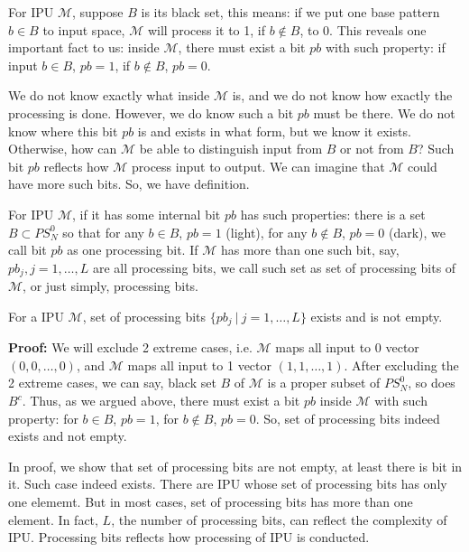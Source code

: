 For IPU $\mathcal{M}$, suppose $B$ is its black set, this means: if we put one base pattern $b \in B$ to input space, $\mathcal{M}$ will process it to 1, if $b \notin B$, to 0. This reveals one important fact to us: inside $\mathcal{M}$, there must exist a bit $pb$ with such property: if input $b \in B$, $pb = 1$, if $b \notin B$, $pb = 0$. 

We do not know exactly what inside $\mathcal{M}$ is, and we do not know how exactly the processing is done. However, we do know such a bit $pb$ must be there. We do not know where this bit $pb$ is and exists in what form, but we know it exists. Otherwise, how can $\mathcal{M}$ be able to distinguish input from $B$ or not from $B$? Such bit $pb$ reflects how $\mathcal{M}$ process input to output. We can imagine that $\mathcal{M}$ could have more such bits. So, we have definition.


\begin{definition}
For IPU $\mathcal{M}$, if it has some internal bit $pb$ has such properties: there is a set $B \subset PS^0_N$ so that for any $b \in B$, $pb = 1$ (light), for any $b \not\in B$, $pb = 0$ (dark), we call bit $pb$ as one processing bit. If $\mathcal{M}$ has more than one such bit, say, $pb_j, j=1, \ldots, L$ are all processing bits, we call such set as set of processing bits of  $\mathcal{M}$, or just simply, processing bits.
\end{definition}


\begin{theorem}
For a IPU $\mathcal{M}$, set of processing bits $\{pb_j \ |\ j=1, \ldots, L\}$ exists and is not empty.
\end{theorem}
{\bf Proof: } We will exclude 2 extreme cases, i.e. $\mathcal{M}$ maps all input to 0 vector $(0, 0, \ldots, 0)$, and $\mathcal{M}$ maps all input to 1 vector $(1, 1, \ldots, 1)$. After excluding the 2 extreme cases, we can say, black set $B$ of $\mathcal{M}$ is a proper subset of $PS^0_N$, so does $B^c$. Thus, as we argued above, there must exist a bit $pb$ inside $\mathcal{M}$ with such property: for $b \in B$, $pb = 1$, for $b \notin B$, $pb = 0$. So, set of processing bits indeed exists and not empty.
 
In proof, we show that set of processing bits are not empty, at least there is bit in it. Such case indeed exists. There are IPU whose set of processing bits has only one elememt. But in most cases, set of processing bits has more than one element. In fact, $L$, the number of processing bits, can reflect the complexity of IPU. Processing bits reflects how processing of IPU is conducted.  



